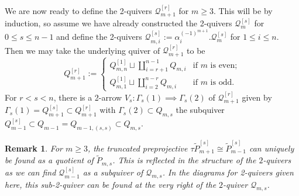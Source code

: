 \documentclass{amsart}
\newtheorem{remark}[theorem]{Remark}
\numberwithin{equation}{section}
\newcommand{\cQ}{\mathcal{Q}}
\begin{document}
We are now ready to define the 2-quivers $\cQ_{m+1}^{[r]}$ for $m\ge3$.
This will be by induction, so assume we have already constructed the 2-quivers $\cQ_m^{[s]}$ for $0\le s\le n-1$ and define the 2-quivers $\cQ_{m,i}^{[s]}:=\alpha_i^{(-1)^{m+1}}.\cQ_m^{[s]}$ for $1\le i\le n$. 
Then we may take the underlying quiver of $\cQ_{m+1}^{[r]}$ to be
\begin{equation}
  \label{eq:recursive 2-quivers}
  Q_{m+1}^{[r]}:=
  \begin{cases}
    Q_{m,n}^{[1]}\sqcup\coprod\limits_{i=r+1}^{n-1} Q_{m,i} & \text{if $m$ is even;}\\
    Q_{m,1}^{[1]}\sqcup\coprod\limits_{i=2}^{n-r} Q_{m,i} & \text{if $m$ is odd.}
  \end{cases}
\end{equation}
For $r<s<n$, there is a 2-arrow $V_s:\Gamma_s(1)\implies\Gamma_s(2)$ of $\cQ_{m+1}^{[r]}$ given by $\Gamma_s(1)=Q_{m+1}^{[s]}\subset Q_{m+1}^{[r]}$ with $\Gamma_s(2)\subset Q_{m,s}$ the subquiver $Q_{m-1}^{[s]}\subset Q_{m-1}=Q_{m-1,(s,s)}\subset Q_{m,s}$.
\begin{remark}
  For $m\geq 3$, the truncated preprojective $\tau\tilde P_{m+1}^{[s]}\cong\tilde P_{m-1}^{[s]}$ can uniquely be found as a quotient of $\tilde P_{m,s}$.
  This is reflected in the structure of the $2$-quivers as we can find $\cQ_{m-1}^{[s]}$ as a subquiver of $\cQ_{m,s}$.
  In the diagrams for 2-quivers given here, this sub-2-quiver can be found at the very right of the $2$-quiver $\mathcal Q_{m,s}$.
\end{remark}
\end{document}
